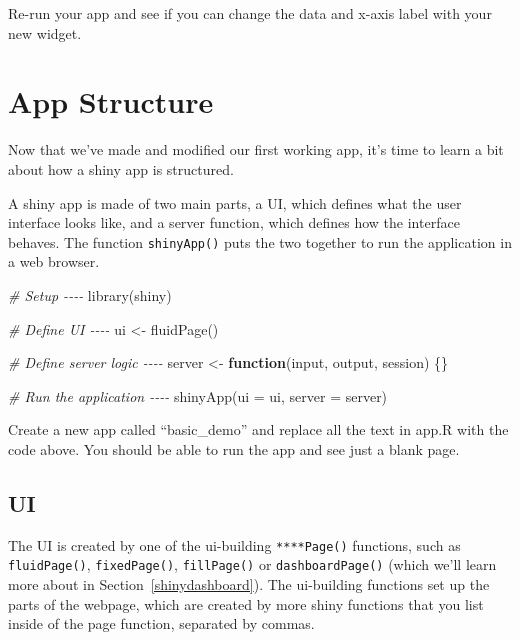 \documentclass[
  oneside]{book}
\newenvironment{Shaded}{\begin{snugshade}}{\end{snugshade}}
\newcommand{\AttributeTok}[1]{\textcolor[rgb]{0.77,0.63,0.00}{#1}}
\newcommand{\CommentTok}[1]{\textcolor[rgb]{0.56,0.35,0.01}{\textit{#1}}}
\newcommand{\ControlFlowTok}[1]{\textcolor[rgb]{0.13,0.29,0.53}{\textbf{#1}}}
\newcommand{\FunctionTok}[1]{\textcolor[rgb]{0.00,0.00,0.00}{#1}}
\newcommand{\NormalTok}[1]{#1}
\newcommand{\OtherTok}[1]{\textcolor[rgb]{0.56,0.35,0.01}{#1}}
\begin{document}
Re-run your app and see if you can change the data and x-axis label with your new widget.

\hypertarget{app-structure}{%
\section{App Structure}\label{app-structure}}

Now that we've made and modified our first working app, it's time to learn a bit about how a shiny app is structured.

A shiny app is made of two main parts, a UI, which defines what the user interface looks like, and a server function, which defines how the interface behaves. The function \texttt{shinyApp}\texttt{()} puts the two together to run the application in a web browser.

\begin{Shaded}
\begin{Highlighting}[]
\CommentTok{\# Setup {-}{-}{-}{-}}
\FunctionTok{library}\NormalTok{(shiny)}

\CommentTok{\# Define UI {-}{-}{-}{-}}
\NormalTok{ui }\OtherTok{\textless{}{-}} \FunctionTok{fluidPage}\NormalTok{()}

\CommentTok{\# Define server logic {-}{-}{-}{-}}
\NormalTok{server }\OtherTok{\textless{}{-}} \ControlFlowTok{function}\NormalTok{(input, output, session) \{\}}

\CommentTok{\# Run the application {-}{-}{-}{-}}
\FunctionTok{shinyApp}\NormalTok{(}\AttributeTok{ui =}\NormalTok{ ui, }\AttributeTok{server =}\NormalTok{ server)}
\end{Highlighting}
\end{Shaded}

\begin{try}
Create a new app called ``basic\_demo'' and replace all the text in app.R with the code above. You should be able to run the app and see just a blank page.

\end{try}

\hypertarget{ui}{%
\subsection{UI}\label{ui}}

The UI is created by one of the ui-building \texttt{****Page()} functions, such as \texttt{fluidPage}\texttt{()}, \texttt{fixedPage}\texttt{()}, \texttt{fillPage}\texttt{()} or \texttt{dashboardPage}\texttt{()} (which we'll learn more about in Section~\ref{shinydashboard}). The ui-building functions set up the parts of the webpage, which are created by more shiny functions that you list inside of the page function, separated by commas.
\end{document}
